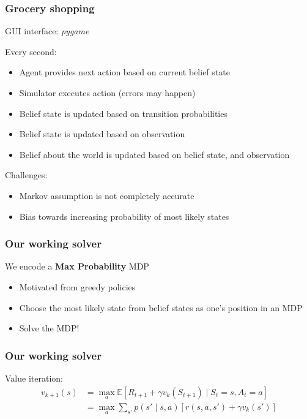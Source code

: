\documentclass[10pt, compress]{beamer}
\begin{document}
\begin{frame}[fragile]
  \frametitle{Grocery shopping}

  GUI interface: {\it pygame}

  Every second:
  \begin{itemize}
  \item Agent provides next action based on current belief state
  \item Simulator executes action (errors may happen)
  \item Belief state is updated based on transition probabilities
  \item Belief state is updated based on observation
  \item Belief about the world is updated based on belief state, and observation
  \end{itemize}

  Challenges:
  \begin{itemize}
  \item Markov assumption is not completely accurate
  \item Bias towards increasing probability of most likely states
  \end{itemize}
\end{frame}


\begin{frame}[fragile]
  \frametitle{Our working solver}
  We encode a \textbf{Max Probability} MDP
  \begin{itemize}
  \item Motivated from greedy policies
  \item Choose the most likely state from belief states as one's position in an
  MDP
  \item Solve the MDP!
  \end{itemize}
\end{frame}

\begin{frame}[fragile]
  \frametitle{Our working solver}
  Value iteration:
  \begin{align*}
  v_{k+1}(s) &= \max_a \mathbb{E}[R_{t+1} + \gamma v_k(S_{t+1}) \mid S_t = s, A_t = a] \\
  &= \max_a \sum_{s'} p(s' \mid s,a) [r(s,a,s') + \gamma v_k(s')]
  \end{align*}
\end{frame}
\end{document}
